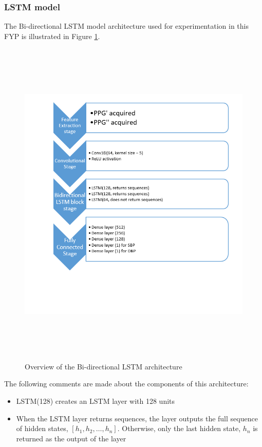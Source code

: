 \subsubsection{LSTM model}
The Bi-directional LSTM model architecture used for experimentation in this FYP is illustrated in Figure \ref{lstmArch}.
\begin{figure}[H]
    \centering
    \includegraphics[width=16cm,height=16cm,keepaspectratio]{Implementation/lstmArch.png}
    \caption{Overview of the Bi-directional LSTM architecture}
    \label{lstmArch}
\end{figure}\noindent The following comments are made about the components of this architecture:
\begin{itemize}
    \item LSTM(128) creates an LSTM layer with 128 units
    \item When the LSTM layer returns sequences, the layer outputs the full sequence of hidden states, $[h_1, h_2, \dots, h_n]$. Otherwise, only the last hidden state, $h_n$ is returned as the output of the layer 
\end{itemize}


